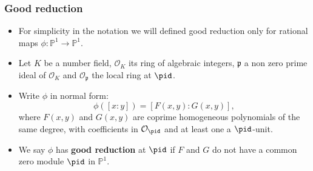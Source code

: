 \documentclass{beamer}
\def\PP{{\mathbb P}}
\def\QQ{{\mathbb Q}}
\theoremstyle{thmstyle}
\newtheorem*{mythm}{Theorem}
\theoremstyle{mystyle}
\theoremstyle{qstnstyle}
\begin{document}
\begin{frame}
\frametitle{Good reduction}

\begin{itemize}
\item For simplicity in the notation we will defined good reduction only for rational maps $\phi:\mathbb{P}^1\to\mathbb{P}^1$. \pause
\item Let $K$ be a number field, $\mathcal{O}_K$ its ring of algebraic integers, $\mathfrak{p}$ a non zero prime ideal of $\mathcal{O}_K$
and $\mathcal{O}_{\mathfrak{p}}$ the local ring at $\pid$. \pause
\item Write $\phi$ in normal form: 
$$\phi([x : y]) = [F(x, y): G(x, y)],$$
where $F(x, y)$ and $G(x, y)$ are coprime
homogeneous polynomials of the same degree, with coefficients in $\mathcal{O}_\pid$ and at least one a $\pid$-unit. \pause
\item We say $\phi$ has \textbf{good reduction} at $\pid$ if $F$ and $G$ do not have a common zero module $\pid$ in $\mathbb{P}^1$.   

\end{itemize}
\end{frame}





\end{document}

